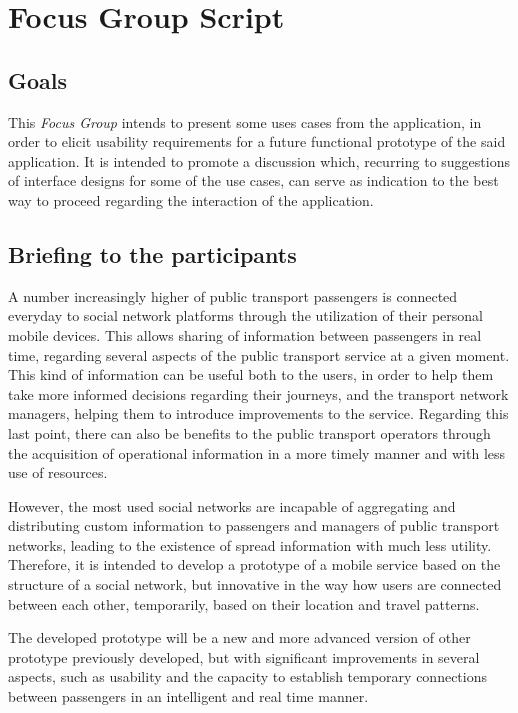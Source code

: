 \chapter{Focus Group Script} \label{ap1:focgr}

\section{Goals}

This \emph{Focus Group} intends to present some uses cases from the application, in order to elicit usability requirements for a future functional prototype of the said application.
It is intended to promote a discussion which, recurring to suggestions of interface designs for some of the use cases, can serve as indication to the best way to proceed regarding the interaction of the application.

\section{Briefing to the participants}

A number increasingly higher of public transport passengers is connected everyday to social network platforms through the utilization of their personal mobile devices. This allows sharing of information between passengers in real time, regarding several aspects of the public transport service at a given moment.
This kind of information can be useful both to the users, in order to help them take more informed decisions regarding their journeys, and the transport network managers, helping them to introduce improvements to the service.
Regarding this last point, there can also be benefits to the public transport operators through the acquisition of operational information in a more timely manner and with less use of resources.

However, the most used social networks are incapable of aggregating and distributing custom information to passengers and managers of public transport networks, leading to the existence of spread information with much less utility. Therefore, it is intended to develop a prototype of a mobile service based on the structure of a social network, but innovative in the way how users are connected between each other, temporarily, based on their location and travel patterns. 

The developed prototype will be a new and more advanced version of other prototype previously developed, but with significant improvements in several aspects, such as usability and the capacity to establish temporary connections between passengers in an intelligent and real time manner.

